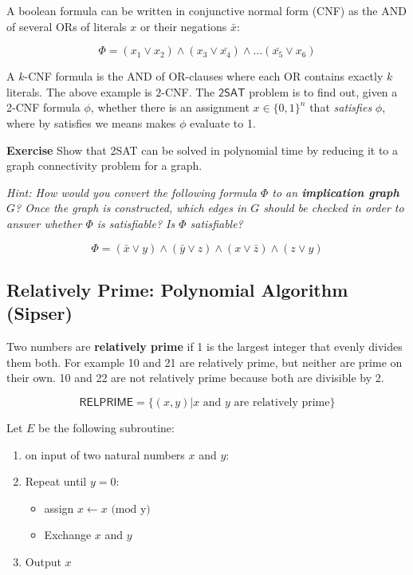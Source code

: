 \documentclass[11pt]{article}
\theoremstyle{definition}
\theoremstyle{remark}
\begin{document}
\noindent A boolean formula can be written in conjunctive normal form (CNF) as the AND of
several ORs of literals $x$ or their negations $\bar{x}$:

$$ \Phi = (x_1 \vee x_2) \wedge (x_3 \vee \bar{x_4}) \wedge ... (\bar{x_5} \vee x_6)$$

\noindent A $k$-CNF formula is the AND of OR-clauses where each OR contains exactly $k$ literals. The above example is $2$-CNF. The $\textsf{2SAT}$ problem is to find out, given a 2-CNF formula $\phi$, whether there is an assignment $x \in \{0, 1\}^n$ that \textit{satisfies} $\phi$, where by satisfies we means makes $\phi$ evaluate to 1.

\noindent \textbf{Exercise} Show that \textsf{2SAT} can be solved in polynomial time by reducing
it to a graph connectivity problem for a graph. 

\textit{Hint: How would you convert the following formula $\Phi$
to an \textbf{implication graph} $G$? Once the graph is constructed, which edges 
in $G$ should be checked in order to answer whether $\Phi$ is satisfiable? Is $\Phi$ satisfiable?}

$$ \Phi = (\bar{x} \vee y) \wedge (\bar{y} \vee z) \wedge (x \vee \bar{z}) \wedge (z \vee y) $$



\subsection{Relatively Prime: Polynomial Algorithm (Sipser)}

\noindent Two numbers are \textbf{relatively prime} if 1 is the largest integer
that evenly divides them both. For example 10 and 21 are relatively prime, but neither
are prime on their own. 10 and 22 are not relatively prime because both are divisible by 2.

$$ \textsf{RELPRIME} = \{ (x,y) | x \text{ and } y \text{ are relatively prime} \} $$

\noindent Let $E$ be the following subroutine: 
\begin{enumerate}
\item on input of two natural numbers $x$ and $y$:
\item Repeat until $y = 0$:
	\begin{itemize}
		\item assign $x \leftarrow x \text{ (mod y)}$
		\item Exchange $x$ and $y$
	\end{itemize}
\item Output $x$
\end{enumerate}
\end{document}
